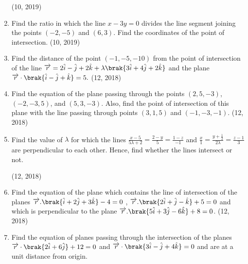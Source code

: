 \begin{enumerate}[label=\thesubsection.\arabic*, ref=\thesubsection.\theenumi]
	\hfill (10, 2019)
\item Find the ratio in which the line $x - 3y = 0$ divides the line segment joining the points $(-2, -5)$ and $(6, 3)$. Find the coordinates of the point of intersection. \hfill (10, 2019)
\item Find the distance of the point $(-1, -5, -10)$ from the point of intersection of the line 
	$\overrightarrow{r} = 2\hat{i} - \hat{j} + 2\hat{k} + \lambda \brak{3\hat{i} + 4\hat{j} + 2\hat{k}}$ 
and the plane 
		$\overrightarrow{r} \cdot \brak{\hat{i} - \hat{j} + \hat{k}} = 5.$
\hfill (12, 2018)
\item Find the equation of the plane passing through the points $(2, 5, -3)$, $(-2, -3, 5)$, and $(5, 3, -3)$. Also, find the point of intersection of this plane with the line passing through points $(3, 1, 5)$ and $(-1, -3, -1)$. \hfill (12, 2018)
\item Find the value of $\lambda$ for which the lines 
$\frac{x - 5}{5\lambda + 2} = \frac{2 - y}{5} = \frac{1 - z}{-1}$
and
$\frac{x}{1} = \frac{y + \frac{1}{2}}{2\lambda} = \frac{z - 1}{3}$
are perpendicular to each other.
Hence, find whether the lines intersect or not.

		\hfill (12, 2018)
\item Find the equation of the plane which contains the line of intersection of the planes $ \overrightarrow{r}.\brak{\hat{i} + 2\hat{j}+3\hat{k}}-4=0$ , $\overrightarrow{r}.\brak{2\hat{i} + \hat{j} - \hat{k}}+5=0$ and which is perpendicular to the plane $\overrightarrow{r}.\brak{5\hat{i} + 3\hat{j} - 6\hat{k}}+8=0$.
\hfill (12, 2018)
\item Find the equation of planes passing through the intersection  of the planes $\overrightarrow{r} \cdot \brak{2\hat{i}+6\hat{j}}+12=0$ and $\overrightarrow{r} \cdot \brak{3\hat{i}-\hat{j}+4\hat{k}}=0$ and are at a unit distance from origin.


\end{enumerate}
